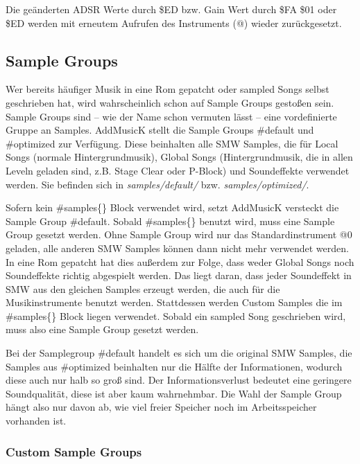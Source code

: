 Die geänderten ADSR Werte durch \$ED bzw. Gain Wert durch \$FA \$01 oder \$ED werden mit erneutem Aufrufen des Instruments (@) wieder zurückgesetzt.

\subsection{Sample Groups}

Wer bereits häufiger Musik in eine Rom gepatcht oder sampled Songs selbst geschrieben hat, wird wahrscheinlich schon auf Sample Groups gestoßen sein. \\
Sample Groups sind -- wie der Name schon vermuten lässt -- eine vordefinierte Gruppe an Samples. AddMusicK stellt die Sample Groups \#default und \#optimized zur Verfügung. Diese beinhalten alle SMW Samples, die für Local Songs (normale Hintergrundmusik), Global Songs (Hintergrundmusik, die in allen Leveln geladen sind, z.B. Stage Clear oder P-Block) und Soundeffekte verwendet werden.
Sie befinden sich in \textit{samples/default/} bzw. \textit{samples/optimized/}.

\bigskip

Sofern kein \#samples\{\} Block verwendet wird, setzt AddMusicK versteckt die Sample Group \#default. Sobald \#samples\{\} benutzt wird, muss eine Sample Group gesetzt werden.
Ohne Sample Group wird nur das Standardinstrument @0 geladen, alle anderen SMW Samples können dann nicht mehr verwendet werden. \\
In eine Rom gepatcht hat dies außerdem zur Folge, dass weder Global Songs noch Soundeffekte richtig abgespielt werden. Das liegt daran, dass jeder Soundeffekt in SMW aus den gleichen Samples erzeugt werden, die auch für die Musikinstrumente benutzt werden.
Stattdessen werden Custom Samples die im \#samples\{\} Block liegen verwendet. Sobald ein sampled Song geschrieben wird, muss also eine Sample Group gesetzt werden.

\bigskip

Bei der Samplegroup \#default handelt es sich um die original SMW Samples, die Samples aus \#optimized beinhalten nur die Hälfte der Informationen, wodurch diese auch nur halb so groß sind.
Der Informationsverlust bedeutet eine geringere Soundqualität, diese ist aber kaum wahrnehmbar. Die Wahl der Sample Group hängt also nur davon ab, wie viel freier Speicher noch im Arbeitsspeicher vorhanden ist.

\subsubsection*{Custom Sample Groups}

